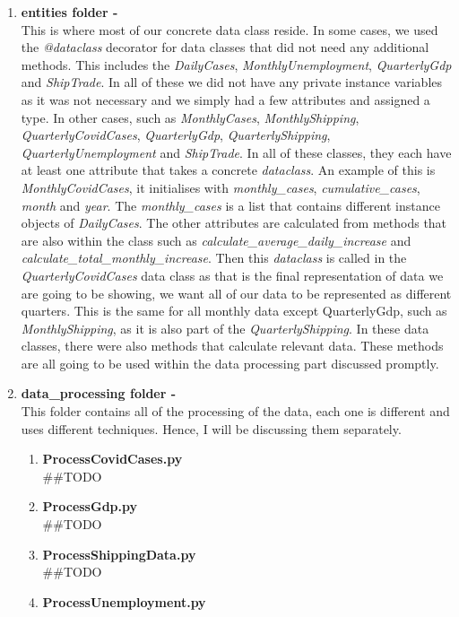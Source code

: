 \documentclass[fontsize=11pt]{article}
\begin{document}
\begin{enumerate}
    \item \textbf{entities folder -}\\
    This is where most of our concrete data class reside. In some cases, we used the \textit{@dataclass} decorator for data classes that did not need any additional methods. This includes the \textit{DailyCases}, \textit{MonthlyUnemployment}, \textit{QuarterlyGdp} and \textit{ShipTrade}. In all of these we did not have any private instance variables as it was not necessary and we simply had a few attributes and assigned a type. In other cases, such as \textit{MonthlyCases}, \textit{MonthlyShipping}, \textit{QuarterlyCovidCases}, \textit{QuarterlyGdp}, \textit{QuarterlyShipping}, \textit{QuarterlyUnemployment} and \textit{ShipTrade}. In all of these classes, they each have at least one attribute that takes a concrete \textit{dataclass}. An example of this is \textit{MonthlyCovidCases}, it initialises with \textit{monthly\_cases}, \textit{cumulative\_cases}, \textit{month} and \textit{year}. The \textit{monthly\_cases} is a list that contains different instance objects of \textit{DailyCases}. The other attributes are calculated from methods that are also within the class such as \textit{calculate\_average\_daily\_increase} and \textit{calculate\_total\_monthly\_increase}. Then this \textit{dataclass} is called in the \textit{QuarterlyCovidCases} data class as that is the final representation of data we are going to be showing, we want all of our data to be represented as different quarters. This is the same for all monthly data except QuarterlyGdp, such as \textit{MonthlyShipping}, as it is also part of the \textit{QuarterlyShipping}. In these data classes, there were also methods that calculate relevant data. These methods are all going to be used within the data processing part discussed promptly.
    
    \item \textbf{data\_processing folder -}\\
    This folder contains all of the processing of the data, each one is different and uses different techniques. Hence, I will be discussing them separately.
    
    \begin{enumerate}
        \item \textbf{ProcessCovidCases.py}\\
        ##TODO
        \item \textbf{ProcessGdp.py}\\
        ##TODO
        \item \textbf{ProcessShippingData.py}\\
        ##TODO
        \item \textbf{ProcessUnemployment.py}
    \end{enumerate}
    

\end{enumerate}
\end{document}
